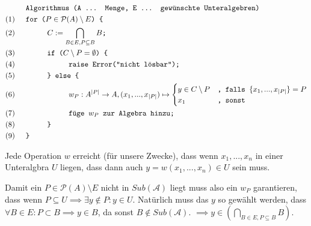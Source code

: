 \documentclass[]{article}
\begin{document}
	\begin{alignat*}{1}
		& \texttt{Algorithmus (A ... Menge, E ... gewünschte Unteralgebren)}\\
		(1) \hspace{0.5cm} &\texttt{for (} P \in \mathcal{P}(A) \setminus E \texttt{) \{}\\
		(2) \hspace{0.5cm} &\hspace{1cm} C := \bigcap_{B \in E, P\subseteq B}B\texttt{;}\\
		(3) \hspace{0.5cm} &\hspace{1cm} \texttt{if (}C\setminus P = \emptyset \texttt{) \{}\\
		(4) \hspace{0.5cm} &\hspace{2cm} \texttt{raise Error("nicht lösbar");}\\
		(5) \hspace{0.5cm} &\hspace{1cm} \texttt{\} else \{}\\
		(6) \hspace{0.5cm} &\hspace{2cm} w_P : A^{|P|} \rightarrow A, (x_1, ..., x_{|P|})\mapsto \begin{cases}
			y \in C \setminus P & \texttt{, falls } \{x_1, ..., x_{|P|}\} = P\\
			x_1 & \texttt{, sonst}
		\end{cases} \\
		(7) \hspace{0.5cm} &\hspace{2cm} \texttt{füge } w_P \texttt{ zur Algebra hinzu;}\\
		(8) \hspace{0.5cm} &\hspace{1cm} \texttt{\}}\\
		(9) \hspace{0.5cm} &\texttt{\}}\\
	\end{alignat*}

	Jede Operation $w$ erreicht (für unsere Zwecke), dass wenn $x_1, ..., x_n$ in einer Unteralgbra $U$ liegen, dass dann auch $y = w(x_1, ..., x_n) \in U$ sein muss.
	
	Damit ein $P \in \mathcal{P}(A)\setminus E$ nicht in $Sub(\mathcal{A})$ liegt muss also ein $w_P$ garantieren, dass wenn $P \subseteq U \implies \exists y \notin P: y \in U$. Natürlich muss das $y$ so gewählt werden, dass $\forall B \in E: P\subset B \implies y \in B$, da sonst $B \notin Sub(\mathcal{A})$. $\implies y \in \left(\bigcap_{B \in E, P\subseteq B}B\right)$.
	
\end{document}
